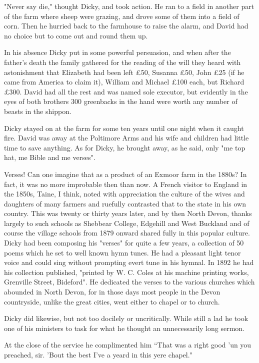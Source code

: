 "Never say die," thought Dicky, and took action. He ran to a field in another part of the farm where sheep were grazing, and drove some of them into a field of corn. Then he hurried back to the farmhouse to raise the alarm, and David had no choice but to come out and round them up.

In his absence Dicky put in some powerful persuasion, and when after the father's death the family gathered for the reading of the will they heard with astonishment that Elizabeth had been left £50, Susanna £50, John £25 (if he came from America to claim it), William and Michael £100 each, but Richard £300. David had all the rest and was named sole executor, but evidently in the eyes of both brothers 300 greenbacks in the hand were worth any number of beasts in the shippon.

\Flourish

Dicky stayed on at the farm for some ten years until one night when it caught fire. David was away at the Poltimore Arms and his wife and children had little time to save anything. As for Dicky, he brought away, as he said, only "me top hat, me Bible and me verses".

Verses! Can one imagine that as a product of an Exmoor farm in the 1880s? In fact, it was no more improbable then than now. A French visitor to England in the 1850s, Taine, I think, noted with appreciation the culture of the wives and daughters of many farmers and ruefully contrasted that to the state in his own country. This was twenty or thirty years later, and by then North Devon, thanks largely to such schools as Shebbear College, Edgehill and West Buckland   and of course the village schools from 1879 onward   shared fully in this popular culture. Dicky had been composing his "verses" for quite a few years, a collection of 50 poems which he set to well known hymn tunes. He had a pleasant light tenor voice and could sing without prompting evert tune in his hymnal. In 1892 he had his collection published, "printed by W. C. Coles at his machine printing works, Grenville Street, Bideford". He dedicated the verses to the various churches which abounded in North Devon,   for in those days most people in the Devon countryside, unlike the great cities, went either to chapel or to church.

Dicky did likewise, but not too docilely or uncritically. While still a lad he took one of his ministers to task for what he thought an unnecessarily long sermon.

At the close of the service he complimented him “That was a right good 'un you preached, sir. 'Bout the best I've a yeard in this yere chapel."

